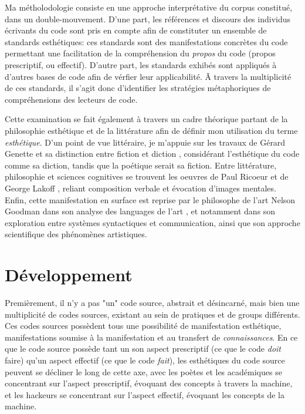 \documentclass{article}
\begin{document}
Ma métholodologie consiste en une approche interprétative du corpus constitué, dans un double-mouvement. D'une part, les références et discours des individus écrivants du code sont pris en compte afin de constituter un ensemble de standards esthétiques: ces standards sont des manifestations concrètes du code permettant une facilitation de la compréhension du \emph{propos} du code (propos prescriptif, ou effectif). D'autre part, les standards exhibés sont appliqués à d'autres bases de code afin de vérfier leur applicabilité. Ã travers la multiplicité de ces standards, il s'agit donc d'identifier les stratégies métaphoriques de compréhensions des lecteurs de code.

Cette examination se fait également à travers un cadre théorique partant de la philosophie esthétique et de la littérature afin de définir mon utilisation du terme \emph{esthétique}. D'un point de vue littéraire, je m'appuie sur les travaux de Gérard Genette et sa distinction entre fiction et diction \citep{genette_fiction_1993}, considérant l'esthétique du code comme sa diction, tandis que la poétique serait sa fiction. Entre littérature, philosophie et sciences cognitives se trouvent les oeuvres de Paul Ricoeur \citep{ricoeur_rule_2003} et de George Lakoff \citep{lakoff_metaphors_1980}, reliant composition verbale et évocation d'images mentales. Enfin, cette manifestation en surface est reprise par le philosophe de l'art Nelson Goodman dans son analyse des languages de l'art \citep{goodman_languages_1976}, et notamment dans son exploration entre systèmes syntactiques et communication, ainsi que son approche scientifique des phénomènes artistiques.

\section*{Développement}

Premièrement, il n'y a pas "un" code source, abstrait et désincarné, mais bien une multiplicité de codes sources, existant au sein de pratiques et de groups différents. Ces codes sources possèdent tous une possibilité de manifestation esthétique, manifestations soumise à la manifestation et au transfert de \emph{connaissances}. En ce que le code source possède tant un son aspect prescriptif (ce que le code \emph{doit} faire) qu'un aspect effectif (ce que le code \emph{fait}), les esthétiques du code source peuvent se décliner le long de cette axe, avec les poètes et les académiques se concentrant sur l'aspect prescriptif, évoquant des concepts à travers la machine, et les hackeurs se concentrant sur l'aspect effectif, évoquant les concepts de la machine.
\end{document}
